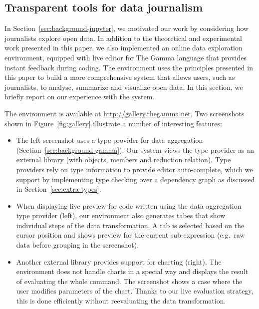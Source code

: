 \documentclass[english,submission]{programming}
\theoremstyle{plain}
\theoremstyle{definition}
\begin{document}

\subsection{Transparent tools for data journalism}
\label{sec:evaluation-case}

In Section~\ref{sec:background-jupyter}, we motivated our work by considering how journalists
explore open data. In addition to the theoretical and experimental work presented in this paper,
we also implemented an online data exploration environment, equipped with live editor for The
Gamma language that provides instant feedback during coding. The environment uses the
principles presented in this paper to build a more comprehensive system that allows users,
such as journalists, to analyse, summarize and visualize open data. In this section, we briefly
report on our experience with the system.

The environment is available at \url{http://gallery.thegamma.net}. Two screenshots shown
in Figure~\ref{fig:gallery} illustrate a number of interesting features:

\begin{itemize}
\item The left screenshot uses a type provider for data aggregation \cite{gamma}
  (Section~\ref{sec:background-gamma}). Our system views the type provider as an external library
  (with objects, members and reduction relation). Type providers rely on type information to
  provide editor auto-complete, which we support by implementing type checking over a
  dependency graph as discussed in Section~\ref{sec:extra-types}.

\item When displaying live preview for code written using the data aggregation type provider (left),
  our environment also generates tabes that show individual steps of the data transformation.
  A tab is selected based on the cursor position and shows preview for the current sub-expression
  (e.g.~raw data before grouping in the screenshot).

\item Another external library provides support for charting (right). The environment does not
  handle charts in a special way and displays the result of evaluating the whole command. The
  screenshot shows a case where the user modifies parameters of the chart. Thanks to our live evaluation
  strategy, this is done efficiently without reevaluating the data transformation.
\end{itemize}
\end{document}
